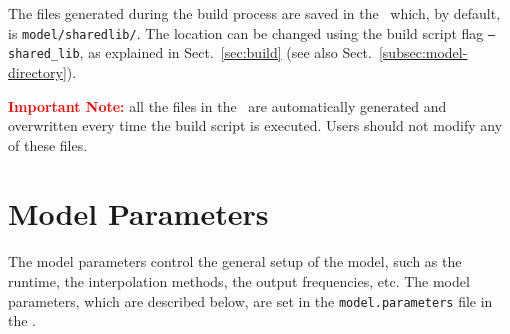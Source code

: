 The files generated during the build process are saved in the \sharedir\ which, by default, is
\texttt{model/sharedlib/}. The location can be changed using the build script flag
\texttt{--shared\_lib}, as explained in Sect.~\ref{sec:build} (see also
Sect.~\ref{subsec:model-directory}).

\medskip \noindent
\textcolor{red}{\bf Important Note:} all the files in the \sharedir\ are automatically
generated and overwritten every time the build script is executed. Users should not modify any
of these files.

\section{Model Parameters} \label{sec:model-parameters}

The model parameters control the general setup of the model, such as the runtime, the
interpolation methods, the output frequencies, etc. The model parameters, which are
described below, are set in the \texttt{model.parameters} file in the \configdir.

